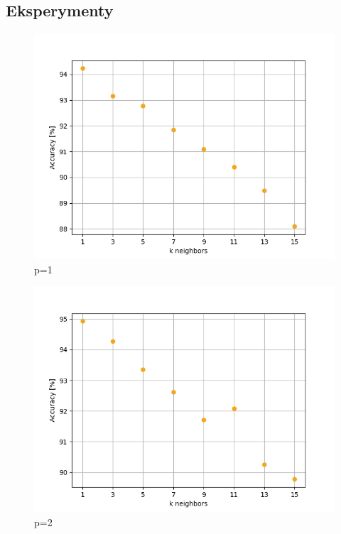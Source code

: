 \documentclass[12pt,a4paper]{article}
\begin{document}
\subsection*{Eksperymenty}
\begin{figure}[!h]
	\includegraphics[scale=1]{"knn1.png"}
	\centering
	\caption{p=1}
\end{figure}
\newpage
\begin{figure}[!h]
	\includegraphics[scale=0.8]{"knn2.png"}
	\centering
	\caption{p=2}
\end{figure}
\end{document}

